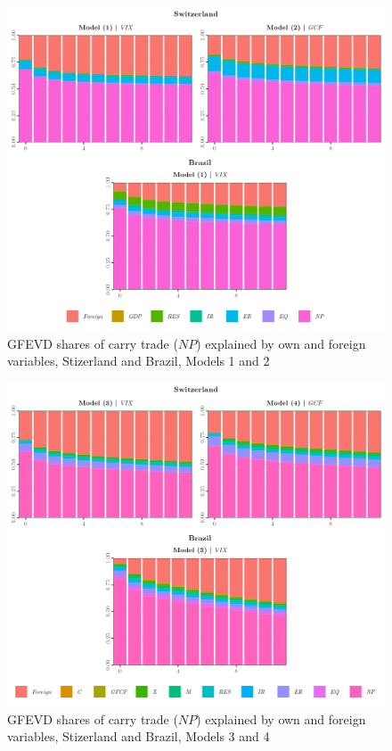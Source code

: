 \documentclass[a4paper, twoside]{templates/ociamthesis}
\begin{document}
\begin{figure}[!ht]

{\centering \includegraphics[width=0.75\columnwidth]{figure/g.GFEVD.MODEL12.CHBR} 

}

\caption{GFEVD shares of carry trade ($NP$) explained by own and foreign variables, Stizerland and Brazil, Models 1 and 2}\label{fig:FigureGFEVD12CH1BR}
\end{figure}

\clearpage

\begin{figure}[!ht]

{\centering \includegraphics[width=0.75\columnwidth]{figure/g.GFEVD.MODEL34.CHBR} 

}

\caption{GFEVD shares of carry trade ($NP$) explained by own and foreign variables, Stizerland and Brazil, Models 3 and 4}\label{fig:FigureGFEVD34CH3BR}
\end{figure}
\end{document}
